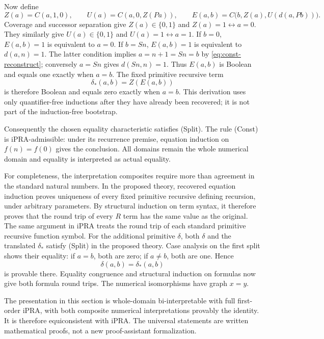 Now define
\[
 Z(a)=C(a,1,0),\qquad U(a)=C(a,0,Z(Pa)),\qquad
 E(a,b)=C\bigl(b,Z(a),U(d(a,Pb))\bigr).
\]
Coverage and successor separation give $Z(a)\in\{0,1\}$ and
$Z(a)=1\leftrightarrow a=0$.  They similarly give
$U(a)\in\{0,1\}$ and $U(a)=1\leftrightarrow a=1$.
If $b=0$, $E(a,b)=1$ is equivalent to $a=0$.
If $b=Sn$, $E(a,b)=1$ is equivalent to $d(a,n)=1$.
The latter condition implies $a=n+1=Sn=b$ by
\eqref{eq:const-reconstruct}; conversely $a=Sn$ gives $d(Sn,n)=1$.
Thus $E(a,b)$ is Boolean and equals one exactly when $a=b$.
The fixed primitive recursive term
\[
                         \delta_*(a,b)=Z(E(a,b))
\]
is therefore Boolean and equals zero exactly when $a=b$.  This
derivation uses only quantifier-free inductions after they have already
been recovered; it is not part of the induction-free bootstrap.

Consequently the chosen equality characteristic satisfies
\textup{(Split)}.  The rule \textup{(Const)} is iPRA-admissible:
under its recurrence premise, equation induction on
$f(n)=f(0)$ gives the conclusion.  All domains remain the whole
numerical domain and equality is interpreted as actual equality.

For completeness, the interpretation composites require more than
agreement in the standard natural numbers.  In the proposed theory,
recovered equation induction proves uniqueness of every fixed primitive
recursive defining recursion, under arbitrary parameters.  By structural
induction on term syntax, it therefore proves that the round trip of
every $R$ term has the same value as the original.  The same argument in
iPRA treats the round trip of each standard primitive recursive function
symbol.  For the additional primitive $\delta$, both $\delta$ and the
translated $\delta_*$ satisfy \textup{(Split)} in the proposed theory.
Case analysis on the first split shows their equality: if $a=b$, both
are zero; if $a\ne b$, both are one.  Hence
\[
                         \delta(a,b)=\delta_*(a,b)
\]
is provable there.  Equality congruence and structural induction on
formulas now give both formula round trips.  The numerical isomorphisms
have graph $x=y$.

\begin{theorem}
The presentation in this section is whole-domain bi-interpretable with
full first-order iPRA, with both composite numerical interpretations
provably the identity.  It is therefore equiconsistent with iPRA.
The universal statements are written mathematical proofs, not a new
proof-assistant formalization.
\end{theorem}

